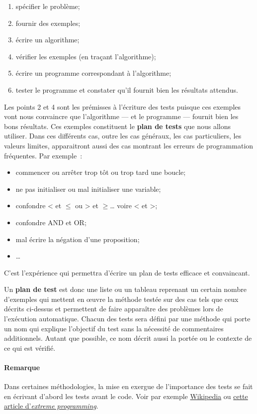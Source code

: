 \begin{enumerate}
	\item spécifier le problème;
	\item fournir des exemples;
	\item écrire un algorithme;
	\item vérifier les exemples (en traçant l'algorithme);
	\item écrire un programme correspondant à l'algorithme;
	\item tester le programme et constater qu'il fournit bien les résultats attendus.
\end{enumerate}

Les points 2 et 4 sont les prémisses à l'écriture des tests puisque ces exemples
vont nous convaincre que l'algorithme --- et le programme --- fournit bien les
\og{}bons\fg{} résultats. Ces exemples constituent le \textbf{plan de tests} que nous allons utiliser. Dans ces différents cas, outre les cas généraux, les cas particuliers, les valeurs limites, apparaitront aussi des cas montrant les erreurs de programmation fréquentes. Par exemple~:

\begin{itemize}
	\item commencer ou arrêter trop tôt ou trop tard une boucle;
	\item ne pas initialiser ou mal initialiser une variable;
	\item confondre < et $\le$ ou > et $\ge$… voire < et >;
	\item confondre AND et OR;
	\item mal écrire la négation d'une proposition;
	\item \dots
\end{itemize}

C'est l'expérience qui permettra d'écrire un plan de tests efficace et
convaincant.

Un \textbf{plan de test} est donc une liste ou un tableau reprenant un certain
nombre d'exemples qui mettent en œuvre la méthode testée sur des cas tels que
ceux décrits ci-dessus et permettent de faire apparaître des problèmes lors de
l'exécution automatique. Chacun des tests sera défini par une méthode qui porte
un nom qui explique l'objectif du test sans la nécessité de commentaires
additionnels. Autant que possible, ce nom décrit aussi la portée ou le contexte
de ce qui est vérifié.

\paragraph{Remarque} Dans certaines méthodologies, la mise en exergue de l'importance des tests se fait en écrivant d'abord les tests avant le code.
Voir par exemple \href{https://fr.wikipedia.org/wiki/Test_driven_development}{Wikipedia} ou \href{http://www.extremeprogramming.org/rules/testfirst.html}{cette article d'\textit{extreme programming}}. 

